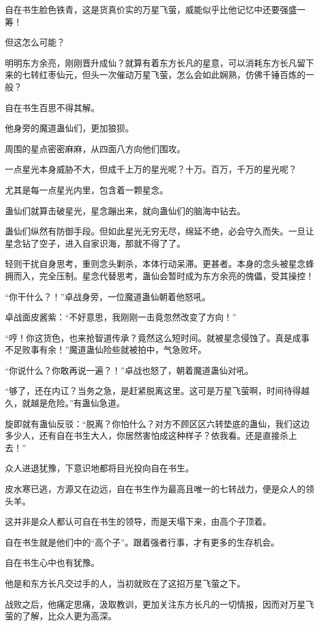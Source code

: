 \begin{this_body}
自在书生脸色铁青，这是货真价实的万星飞萤，威能似乎比他记忆中还要强盛一筹！

但这怎么可能？

明明东方余亮，刚刚晋升成仙？就算有着东方长凡的星意，可以消耗东方长凡留下来的七转红枣仙元，但头一次催动万星飞萤，怎么会如此娴熟，仿佛千锤百炼的一般？

自在书生百思不得其解。

他身旁的魔道蛊仙们，更加狼狈。

周围的星点密密麻麻，从四面八方向他们围攻。

一点星光本身威胁不大，但成千上万的星光呢？十万。百万，千万的星光呢？

尤其是每一点星光内里，包含着一颗星念。

蛊仙们就算击破星光，星念蹦出来，就向蛊仙们的脑海中钻去。

蛊仙们纵然有防御手段。但如此星光无穷无尽，绵延不绝，必会守久而失。一旦让星念钻了空子，进入自家识海，那就不得了了。

轻则干扰自身思考，重则念头剿杀，本体行动呆滞。更甚者。本身的念头被星念蜂拥而入，完全压制。星念代替思考，蛊仙会暂时成为东方余亮的傀儡，受其操控！

“你干什么？！”卓战身旁，一位魔道蛊仙朝着他怒吼。

卓战面皮酱紫：“不好意思，我刚刚一击竟忽然改变了方向！”

“哼！你这货色，也来抢智道传承？竟然这么短时间。就被星念侵蚀了。真是成事不足败事有余！”魔道蛊仙险些就被拍中，气急败坏。

“你说什么？你敢再说一遍？！”卓战也怒了，朝着魔道蛊仙对吼。

“够了，还在内讧？当务之急，是赶紧脱离这里。这可是万星飞萤啊，时间待得越久，就越是危险。”有蛊仙急道。

旋即就有蛊仙反驳：“脱离？你怕什么？对方不顾区区六转垫底的蛊仙，我们这边多少人，还有自在书生大人，你居然害怕成这种样子？依我看。还是直接杀上去！”

众人进退犹豫，下意识地都将目光投向自在书生。

皮水寒已逃，方源又在边远，自在书生作为最高且唯一的七转战力，便是众人的领头羊。

这并非是众人都认可自在书生的领导，而是天塌下来，由高个子顶着。

自在书生就是他们中的“高个子”。跟着强者行事，才有更多的生存机会。

自在书生心中也有犹豫。

他是和东方长凡交过手的人，当初就败在了这招万星飞萤之下。

战败之后，他痛定思痛，汲取教训，更加关注东方长凡的一切情报，因而对万星飞萤的了解，比众人更为高深。


\end{this_body}
